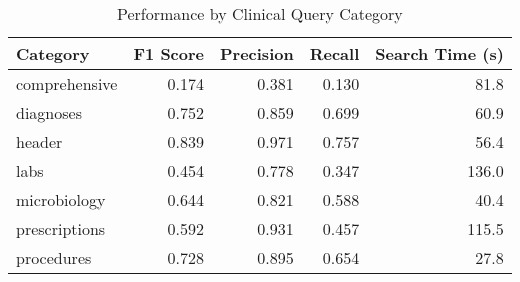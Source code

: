 \begin{table}
\caption{Performance by Clinical Query Category}
\label{tab:category_performance}
\begin{tabular}{lrrrr}
\toprule
Category & F1 Score & Precision & Recall & Search Time (s) \\
\midrule
comprehensive & 0.174 & 0.381 & 0.130 & 81.8 \\
diagnoses & 0.752 & 0.859 & 0.699 & 60.9 \\
header & 0.839 & 0.971 & 0.757 & 56.4 \\
labs & 0.454 & 0.778 & 0.347 & 136.0 \\
microbiology & 0.644 & 0.821 & 0.588 & 40.4 \\
prescriptions & 0.592 & 0.931 & 0.457 & 115.5 \\
procedures & 0.728 & 0.895 & 0.654 & 27.8 \\
\bottomrule
\end{tabular}
\end{table}